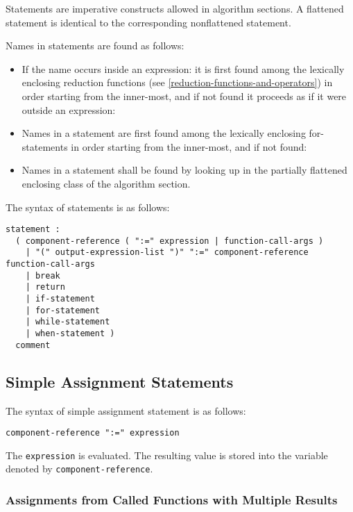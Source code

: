 Statements are imperative constructs allowed in algorithm sections. A
flattened statement is identical to the corresponding nonflattened
statement.

Names in statements are found as follows:

\begin{itemize}
\item
  If the name occurs inside an expression: it is first found among the
  lexically enclosing reduction functions (see \autoref{reduction-functions-and-operators}) in order
  starting from the inner-most, and if not found it proceeds as if it
  were outside an expression:
\item
  Names in a statement are first found among the lexically enclosing
  for-statements in order starting from the inner-most, and if not
  found:
\item
  Names in a statement shall be found by looking up in the partially
  flattened enclosing class of the algorithm section.
\end{itemize}

The syntax of statements is as follows:

\begin{lstlisting}[language=grammar]
statement :
  ( component-reference ( ":=" expression | function-call-args )
    | "(" output-expression-list ")" ":=" component-reference function-call-args
    | break
    | return
    | if-statement
    | for-statement
    | while-statement
    | when-statement )
  comment
\end{lstlisting}

\subsection{Simple Assignment Statements}

The syntax of simple assignment statement is as follows:
\begin{lstlisting}[language=grammar]
component-reference ":=" expression
\end{lstlisting}

The \lstinline!expression! is evaluated. The resulting value is stored into the
variable denoted by \lstinline!component-reference!.

\subsubsection{Assignments from Called Functions with Multiple Results}

